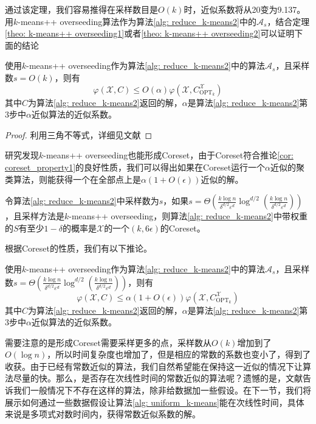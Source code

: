 通过该定理，我们容易推得在采样数目是$O(k)$时，近似系数将从20变为9.137。
用$k$-means++ overseeding算法作为算法\ref{alg: reduce_k-means2}中的$\mathcal{A}_s$，结合定理\ref{theo: k-means++ overseeding1}或者\ref{theo: k-means++ overseeding2}可以证明下面的结论
\begin{corollary}
    使用$k$-means++ overseeding作为算法\ref{alg: reduce_k-means2}中的算法$\mathcal{A}_s$，且采样数$s = O(k)$，则有
    \begin{equation*}
        \varphi(\mathcal{X},C) \leq O(\alpha) \varphi(\mathcal{X},C_{\text{OPT}_k}^{\mathcal{X}})
    \end{equation*}
    其中$C$为算法\ref{alg: reduce_k-means2}返回的解，$\alpha$是算法\ref{alg: reduce_k-means2}第3步中$\alpha$近似算法的近似系数。
\end{corollary}
\begin{proof}
    利用三角不等式，详细见文献\cite{aggarwal2009adaptive}
\end{proof}
研究发现$k$-means++ overseeding也能形成Coreset，由于Coreset符合推论\ref{cor: coreset_property1}的良好性质，我们可以得出如果在Coreset运行一个$\alpha$近似的聚类算法，则能获得一个在全部点上是$\alpha(1+O(\epsilon))$近似的解。
\begin{theorem}
    令算法\ref{alg: reduce_k-means2}中采样数为$s$，如果$s = \Theta\left(\frac{k \log n}{\delta^{d / 2} \varepsilon^{d}} \log ^{d / 2}\left(\frac{k \log n}{\delta^{d / 2} \varepsilon^{d}}\right)\right)$，且采样方法是$k$-means++ overseeding，则算法\ref{alg: reduce_k-means2}中带权重的$S$有至少$1-\delta$的概率是$\mathcal{X}$的一个$(k,6\epsilon)$的Coreset。
\end{theorem}
根据Coreset的性质，我们有以下推论。
\begin{corollary}
    使用$k$-means++ overseeding作为算法\ref{alg: reduce_k-means2}中的算法$\mathcal{A}_s$，且采样数$s = \Theta\left(\frac{k \log n}{\delta^{d / 2} \varepsilon^{d}} \log ^{d / 2}\left(\frac{k \log n}{\delta^{d / 2} \varepsilon^{d}}\right)\right)$，则有
    \begin{equation*}
        \varphi(\mathcal{X},C) \leq \alpha(1+O(\epsilon)) \varphi(\mathcal{X},C_{\text{OPT}_k}^{\mathcal{X}})
    \end{equation*}
    其中$C$为算法\ref{alg: reduce_k-means2}返回的解，$\alpha$是算法\ref{alg: reduce_k-means2}第3步中$\alpha$近似算法的近似系数。
\end{corollary}
需要注意的是形成Coreset需要采样更多的点，采样数从$O(k)$增加到了$O(\log n)$，所以时间复杂度也增加了，但是相应的常数的系数也变小了，得到了收获。由于已经有常数近似的算法，我们自然希望能在保持这一近似的情况下让算法尽量的快。那么，是否存在次线性时间的常数近似的算法呢？遗憾的是，文献\cite{mettu2004optimal}告诉我们一般情况下不存在这样的算法，除非给数据加一些假设。在下一节，我们将展示如何通过一些数据假设让算法\ref{alg: uniform_k-means}能在次线性时间，具体来说是多项式对数时间内，获得常数近似系数的解。